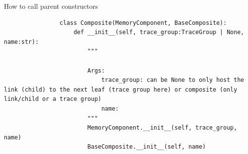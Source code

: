             How to call parent constructors
            \begin{verbatim}
                class Composite(MemoryComponent, BaseComposite):
                    def __init__(self, trace_group:TraceGroup | None, name:str):
                        """
                
                        Args:
                            trace_group: can be None to only host the link (child) to the next leaf (trace group here) or composite (only link/child or a trace group)
                            name:
                        """
                        MemoryComponent.__init__(self, trace_group, name)
                        BaseComposite.__init__(self, name)
            \end{verbatim}